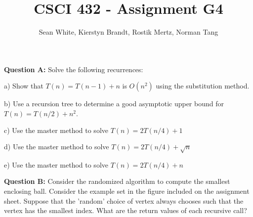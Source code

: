 \documentclass[12pt]{article}
\author{Sean White, Kierstyn Brandt, Rostik Mertz, Norman Tang}
\title{CSCI 432 - Assignment G4}
\begin{document}
\maketitle

\noindent
\textbf{Question A:} Solve the following recurrences: \smallskip

a) Show that $T(n) = T(n - 1) + n$ is $O(n^2)$ using the substitution method. \smallskip

b) Use a recursion tree to determine a good asymptotic upper bound for $T(n) = T(n/2) + n^2$. \smallskip

c) Use the master method to solve $T(n) = 2T(n/4) + 1$ \smallskip

d) Use the master method to solve $T(n) = 2T(n/4) + \sqrt{n}$ \smallskip

e) Use the master method to solve $T(n) = 2T(n/4) + n$ \smallskip

\noindent
\textbf{Question B:} Consider the randomized algorithm to compute the smallest enclosing ball. Consider the example set in the figure included on the assignment sheet. Suppose that the 'random' choice of vertex always chooses such that the vertex has the smallest index. What are the return values of each recursive call? \smallskip
\end{document}
